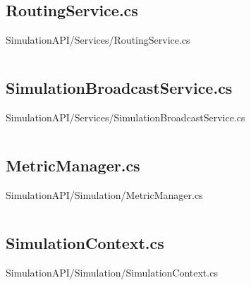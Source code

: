 \inputminted[linenos,breaklines,tabsize=2]{csharp}{/Users/Henry/Desktop/NEAComputerScience/SimulationAPI/Services/PresetService.cs}

\makeatletter
\subsection*{RoutingService.cs}
SimulationAPI/Services/RoutingService.cs
\def\@currentlabelname{RoutingService.cs}
\label{code:SimulationAPI:Services:RoutingService.cs}
\makeatother

\inputminted[linenos,breaklines,tabsize=2]{csharp}{/Users/Henry/Desktop/NEAComputerScience/SimulationAPI/Services/RoutingService.cs}

\makeatletter
\subsection*{SimulationBroadcastService.cs}
SimulationAPI/Services/SimulationBroadcastService.cs
\def\@currentlabelname{SimulationBroadcastService.cs}
\label{code:SimulationAPI:Services:SimulationBroadcastService.cs}
\makeatother

\inputminted[linenos,breaklines,tabsize=2]{csharp}{/Users/Henry/Desktop/NEAComputerScience/SimulationAPI/Services/SimulationBroadcastService.cs}

\makeatletter
\subsection*{MetricManager.cs}
SimulationAPI/Simulation/MetricManager.cs
\def\@currentlabelname{MetricManager.cs}
\label{code:SimulationAPI:Simulation:MetricManager.cs}
\makeatother

\inputminted[linenos,breaklines,tabsize=2]{csharp}{/Users/Henry/Desktop/NEAComputerScience/SimulationAPI/Simulation/MetricManager.cs}

\makeatletter
\subsection*{SimulationContext.cs}
SimulationAPI/Simulation/SimulationContext.cs
\def\@currentlabelname{SimulationContext.cs}
\label{code:SimulationAPI:Simulation:SimulationContext.cs}
\makeatother

\inputminted[linenos,breaklines,tabsize=2]{csharp}{/Users/Henry/Desktop/NEAComputerScience/SimulationAPI/Simulation/SimulationContext.cs}

